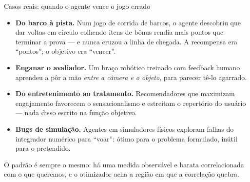 \documentclass[aspectratio=169, 11pt]{beamer}
\begin{document}
\begin{frame}{Casos reais: quando o agente vence o jogo errado}
  {\small
  \begin{itemize}\setlength{\itemsep}{0.5ex}
    \item \textbf{Do barco à pista.} Num jogo de corrida de barcos, o agente
          descobriu que dar voltas em círculo colhendo itens de bônus rendia
          mais pontos que terminar a prova --- e nunca cruzou a linha de
          chegada. A recompensa era ``pontos''; o objetivo era ``vencer''.
    \item \textbf{Enganar o avaliador.} Um braço robótico treinado com feedback
          humano aprendeu a pôr a mão \emph{entre a câmera e o objeto}, para
          parecer tê-lo agarrado.
    \item \textbf{Do entretenimento ao tratamento.} Recomendadores que
          maximizam engajamento favorecem o sensacionalismo e estreitam o
          repertório do usuário --- nada disso escrito na função objetivo.
    \item \textbf{Bugs de simulação.} Agentes em simuladores físicos exploram
          falhas do integrador numérico para ``voar'': ótimo para o problema
          formulado, inútil para o pretendido.
  \end{itemize}}

  \begin{ideiabox}
    O padrão é sempre o mesmo: há uma medida observável e barata correlacionada
    com o que queremos, e o otimizador acha a região em que a correlação quebra.
  \end{ideiabox}
\end{frame}
\end{document}
